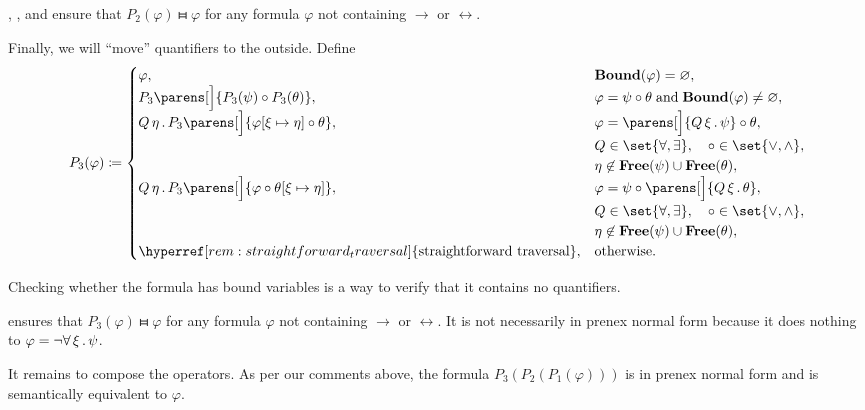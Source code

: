 \begin{algorithm}
\begin{thmenum}
    , ,  and  ensure that \( P_2(\varphi) \gleichstark \varphi \) for any formula \( \varphi \)  not containing \( \rightarrow \) or \( \leftrightarrow \).

     Finally, we will \enquote{move} quantifiers to the outside. Define
    \begin{equation*}
      P_3(\varphi) \coloneqq \begin{cases}
        \varphi,                                                                           &\boldop{Bound}(\varphi) = \varnothing, \\
        P_3\parens[\Big]{ P_3(\psi) \bincirc P_3(\theta) },                                &\varphi = \psi \bincirc \theta \T{and} \boldop{Bound}(\varphi) \neq \varnothing, \\
        \quantifier Q \eta P_3 \parens[\Big]{ \varphi[\xi \mapsto \eta] \bincirc \theta }, &\varphi = \parens[\Big]{ \quantifier Q \xi \psi } \bincirc \theta, \\
                                                                                           &Q \in \set{ \forall, \exists }, \quad \bincirc \in \set{ \vee, \wedge }, \\
                                                                                           &\eta \not\in \boldop{Free}(\psi) \cup \boldop{Free}(\theta), \\
        \quantifier Q \eta P_3 \parens[\Big]{ \varphi \bincirc \theta[\xi \mapsto \eta] }, &\varphi = \psi \bincirc \parens[\Big]{ \quantifier Q \xi \theta }, \\
                                                                                           &Q \in \set{ \forall, \exists }, \quad \bincirc \in \set{ \vee, \wedge }, \\
                                                                                           &\eta \not\in \boldop{Free}(\psi) \cup \boldop{Free}(\theta), \\
        \hyperref[rem:straightforward_traversal]{\T{straightforward traversal}},           &\T{otherwise.}
      \end{cases}
    \end{equation*}

    Checking whether the formula has bound variables is a way to verify that it contains no quantifiers.

     ensures that \( P_3(\varphi) \gleichstark \varphi \) for any formula \( \varphi \) not containing \( \rightarrow \) or \( \leftrightarrow \). It is not necessarily in prenex normal form because it does nothing to \( \varphi = \neg \forall \thinspace \xi \thinspace . \thinspace \psi \).
  \end{thmenum}

  It remains to compose the operators. As per our comments above, the formula \( P_3(P_2(P_1(\varphi))) \) is in prenex normal form and is semantically equivalent to \( \varphi \).
\end{algorithm}

